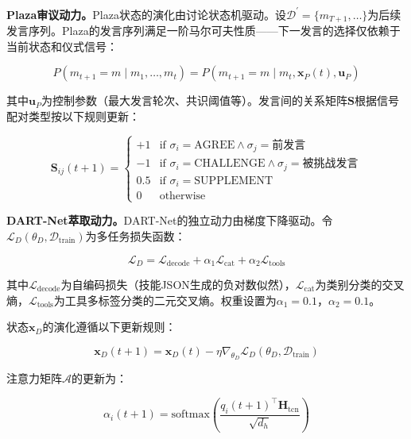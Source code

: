 \documentclass[twocolumn,10.5pt]{ctexart}
\def\cD{\mathcal{D}}
\def\cL{\mathcal{L}}
\begin{document}
\textbf{Plaza审议动力。}Plaza状态的演化由讨论状态机驱动。设$\mathcal{D}^\prime = \{m_{T+1}, \ldots\}$为后续发言序列。Plaza的发言序列满足一阶马尔可夫性质——下一发言的选择仅依赖于当前状态和仪式信号：

\begin{equation}
P(m_{t+1} = m \mid m_1, \ldots, m_t) = P(m_{t+1} = m \mid m_t, \mathbf{x}_P(t), \mathbf{u}_P)
\label{eq:plaza_markov}
\end{equation}

其中$\mathbf{u}_P$为控制参数（最大发言轮次、共识阈值等）。发言间的关系矩阵$\mathbf{S}$根据信号配对类型按以下规则更新：

\begin{equation}
\mathbf{S}_{ij}(t+1) = \begin{cases}
+1 & \text{if } \sigma_i = \mathrm{AGREE} \land \sigma_j = \text{前发言} \\
-1 & \text{if } \sigma_i = \mathrm{CHALLENGE} \land \sigma_j = \text{被挑战发言} \\
0.5 & \text{if } \sigma_i = \mathrm{SUPPLEMENT} \\
0 & \text{otherwise}
\end{cases}
\label{eq:signal_matrix}
\end{equation}

\textbf{DART-Net萃取动力。}DART-Net的独立动力由梯度下降驱动。令$\cL_D(\theta_D, \cD_{\text{train}})$为多任务损失函数：

\begin{equation}
\cL_D = \cL_{\text{decode}} + \alpha_1 \cL_{\text{cat}} + \alpha_2 \cL_{\text{tools}}
\label{eq:dart_loss}
\end{equation}

其中$\cL_{\text{decode}}$为自编码损失（技能JSON生成的负对数似然），$\cL_{\text{cat}}$为类别分类的交叉熵，$\cL_{\text{tools}}$为工具多标签分类的二元交叉熵。权重设置为$\alpha_1 = 0.1$，$\alpha_2 = 0.1$。

状态$\mathbf{x}_D$的演化遵循以下更新规则：

\begin{equation}
\mathbf{x}_D(t+1) = \mathbf{x}_D(t) - \eta \nabla_{\theta_D} \cL_D(\theta_D, \cD_{\text{train}})
\label{eq:dart_update}
\end{equation}

注意力矩阵$\mathcal{A}$的更新为：

\begin{equation}
\alpha_i(t+1) = \mathrm{softmax}\left(\frac{q_i(t+1)^\top \mathbf{H}_{\text{tcn}}}{\sqrt{d_h}}\right)
\label{eq:attn_update}
\end{equation}
\end{document}
